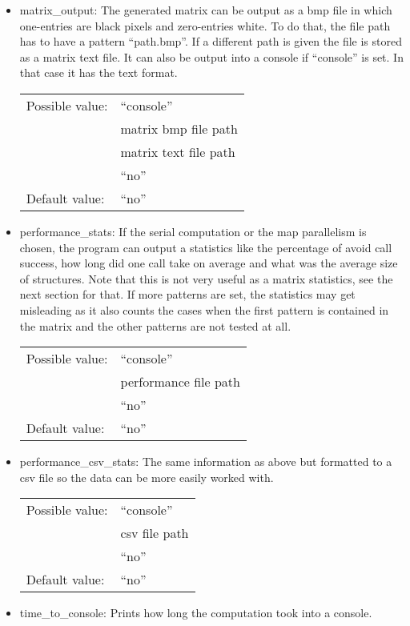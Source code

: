 \begin{itemize}
\item matrix\_output: The generated matrix can be output as a bmp file in which one-entries are black pixels and zero-entries white. To do that, the file path has to have a pattern ``path.bmp''. If a different path is given the file is stored as a matrix text file. It can also be output into a console if ``console'' is set. In that case it has the text format.

\begin{tabular}{ll}
Possible value: & ``console'' \\
& matrix bmp file path \\
& matrix text file path \\
& ``no'' \\
Default value: & ``no''
\end{tabular}

\item performance\_stats: If the serial computation or the map parallelism is chosen, the program can output a statistics like the percentage of avoid call success, how long did one call take on average and what was the average size of structures. Note that this is not very useful as a matrix statistics, see the next section for that. If more patterns are set, the statistics may get misleading as it also counts the cases when the first pattern is contained in the matrix and the other patterns are not tested at all.

\begin{tabular}{ll}
Possible value: & ``console'' \\
& performance file path \\
& ``no'' \\
Default value: & ``no''
\end{tabular}

\item performance\_csv\_stats: The same information as above but formatted to a csv file so the data can be more easily worked with.

\begin{tabular}{ll}
Possible value: & ``console'' \\
& csv file path \\
& ``no'' \\
Default value: & ``no''
\end{tabular}

\item time\_to\_console: Prints how long the computation took into a console.


\end{itemize}
